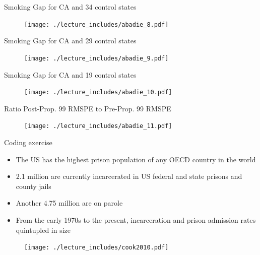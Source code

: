 \documentclass{beamer}
\begin{document}
\begin{frame}{Smoking Gap for CA and 34 control states}
	
	\begin{figure}
	\texttt{[image: ./lecture\_includes/abadie\_8.pdf]}
	\end{figure}
\end{frame}

\begin{frame}{Smoking Gap for CA and 29 control states}
	
	\begin{figure}
	\texttt{[image: ./lecture\_includes/abadie\_9.pdf]}
	\end{figure}
\end{frame}

\begin{frame}{Smoking Gap for CA and 19 control states}
	
	\begin{figure}
	\texttt{[image: ./lecture\_includes/abadie\_10.pdf]}
	\end{figure}
\end{frame}

\begin{frame}{Ratio Post-Prop. 99 RMSPE to Pre-Prop. 99 RMSPE}

	\begin{figure}
	\texttt{[image: ./lecture\_includes/abadie\_11.pdf]}
	\end{figure}
\end{frame}




\begin{frame}{Coding exercise}
	
	\begin{itemize}
	\item The US has the highest prison population of any OECD country in the world 
	\item 2.1 million are currently incarcerated in US federal and state prisons and county jails
	\item Another 4.75 million are on parole
	\item From the early 1970s to the present, incarceration and prison admission rates quintupled in size
	\end{itemize}
\end{frame}



\begin{frame}[plain]

\begin{figure}
\texttt{[image: ./lecture\_includes/cook2010.pdf]}
\end{figure}
\end{frame}
\end{document}
